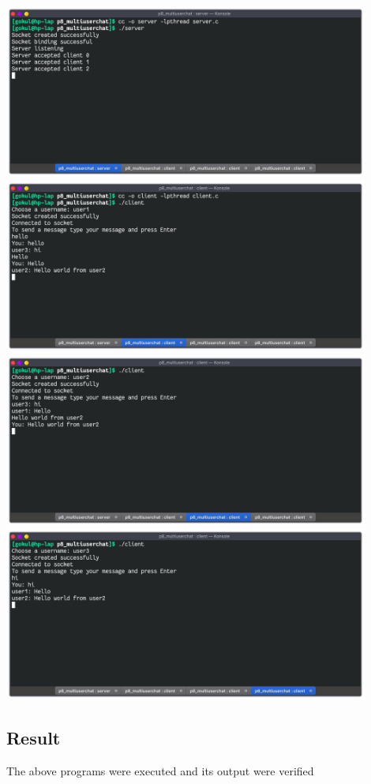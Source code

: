\begin{center}
	\includegraphics[width=0.90\textwidth]{img/p9/ss1.png}
	\includegraphics[width=0.90\textwidth]{img/p9/ss2.png}
	\includegraphics[width=0.90\textwidth]{img/p9/ss3.png}
	\includegraphics[width=0.90\textwidth]{img/p9/ss4.png}
\end{center}


\subsection{Result}
The above programs were executed and its output were verified